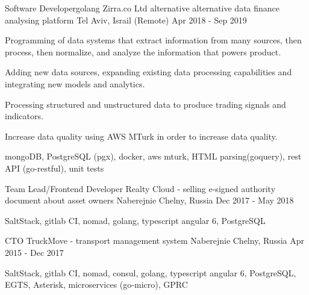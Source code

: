 \begin{cventries}
  \cventry
    {Software Developer{\enskip\cdotp\enskip}golang} %
    {Zirra.co Ltd alternative alternative data finance analysing platform} %
    {Tel Aviv, Israil (Remote)} %
    {Apr 2018 - Sep 2019} %
    {
      \begin{cvitems} %
        \item {Programming of data systems that extract information from many sources, then process, then normalize, and analyze the information that powers product.}
        \item {Adding new data sources, expanding existing data processing capabilities and integrating new models and analytics.}
        \item {Processing structured and unstructured data to produce trading signals and indicators.}
        \item {Increase data quality using AWS MTurk in order to increase data quality.}
        \item {mongoDB, PostgreSQL (pgx), docker, aws mturk, HTML parsing(goquery), rest API (go-restful), unit tests}
      \end{cvitems}
    }

  \cventry
    {Team Lead/Frontend Developer} %
    {Realty Cloud - selling e-signed authority document about asset owners} %
    {Naberejnie Chelny, Russia} %
    {Dec 2017 - May 2018} %
    {
      \begin{cvitems} %
        \item {SaltStack, gitlab CI, nomad, golang, typescript angular 6, PostgreSQL}
      \end{cvitems}
    }

  \cventry
    {CTO} %
    {TruckMove - transport management system} %
    {Naberejnie Chelny, Russia} %
    {Apr 2015 - Dec 2017} %
    {
      \begin{cvitems} %
        \item {SaltStack, gitlab CI, nomad, consul, golang, typescript angular 6, PostgreSQL, EGTS, Asterisk, microservices (go-micro), GPRC}
      \end{cvitems}
    }


\end{cventries}
